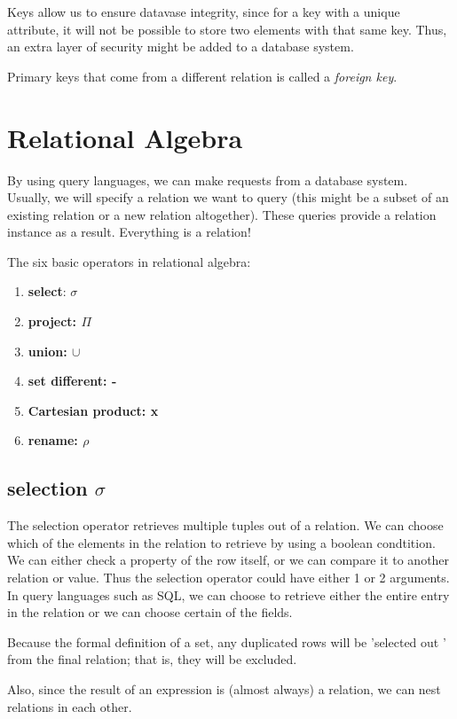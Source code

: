\documentclass{article}
\begin{document}
Keys allow us to ensure datavase integrity, since for a key with a unique attribute, it will not be possible to store two
elements with that same key. Thus, an extra layer of security might be added to a database system.

Primary keys that come from a different relation is called a \textit{foreign key}.
\section{Relational Algebra}
By using query languages, we can make requests from a database system. Usually, we will specify a relation we want to 
query (this might be a subset of an existing relation or a new relation altogether). These queries provide a relation
instance as a result. Everything is a relation!

The six basic operators in relational algebra:
\begin{enumerate}
		\item{\textbf{select}: $\sigma$}

		\item{\textbf{project: $\Pi$}}

		\item{\textbf{union: $\cup$}}
		
		\item{\textbf{set different: -}}

		\item{\textbf{Cartesian product: x}}
		
		\item{\textbf{rename: $\rho$}}	
\end{enumerate}
\subsection{selection $\sigma$}
The selection operator retrieves multiple tuples out of a relation.  We can choose which of the elements in the relation to 
retrieve by using a boolean condtition. We can either check a property of the row itself, or we can compare it to another
relation or value. Thus the selection operator could have either 1 or 2 arguments. In query languages such as SQL, we can 
choose to retrieve either the entire entry in the relation or we can choose certain of the fields.

Because the formal definition of a set, any duplicated rows will be 'selected out ' from the final relation; that is, they will be
excluded.

Also, since the result of an expression is (almost always) a relation, we can nest relations in each other.
\end{document}
